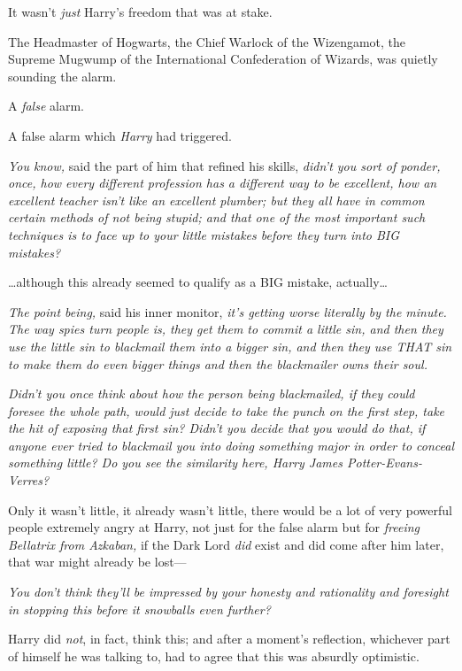 It wasn't \emph{just} Harry's freedom that was at stake.

The Headmaster of Hogwarts, the Chief Warlock of the Wizengamot, the Supreme 
Mugwump of the International Confederation of Wizards, was quietly sounding the 
alarm.

A \emph{false} alarm.

A false alarm which \emph{Harry} had triggered.

\emph{You know,} said the part of him that refined his skills, \emph{didn't you 
sort of ponder, once, how every different profession has a different way to be 
excellent, how an excellent teacher isn't like an excellent plumber; but they 
all have in common certain methods of not being stupid; and that one of the 
most important such techniques is to face up to your little mistakes before 
they turn into BIG mistakes?}

{\ldots}although this already seemed to qualify as a BIG mistake, 
actually{\ldots}

\emph{The point being,} said his inner monitor, \emph{it's getting worse 
literally by the minute. The way spies turn people is, they get them to commit 
a little sin, and then they use the little sin to blackmail them into a bigger 
sin, and then they use THAT sin to make them do even bigger things and then the 
blackmailer owns their soul.}

\emph{Didn't you once think about how the person being blackmailed, if they 
could foresee the whole path, would just decide to take the punch on the first 
step, take the hit of exposing that first sin? Didn't you decide that you would 
do that, if anyone ever tried to blackmail you into doing something major in 
order to conceal something little? Do you see the similarity here, Harry James 
Potter-Evans-Verres?}

Only it wasn't little, it already wasn't little, there would be a lot of very 
powerful people extremely angry at Harry, not just for the false alarm but for 
\emph{freeing Bellatrix from Azkaban,} if the Dark Lord \emph{did} exist and 
did come after him later, that war might already be lost---

\emph{You don't think they'll be impressed by your honesty and rationality and 
foresight in stopping this before it snowballs even further?}

Harry did \emph{not}, in fact, think this; and after a moment's reflection, 
whichever part of himself he was talking to, had to agree that this was 
absurdly optimistic.

